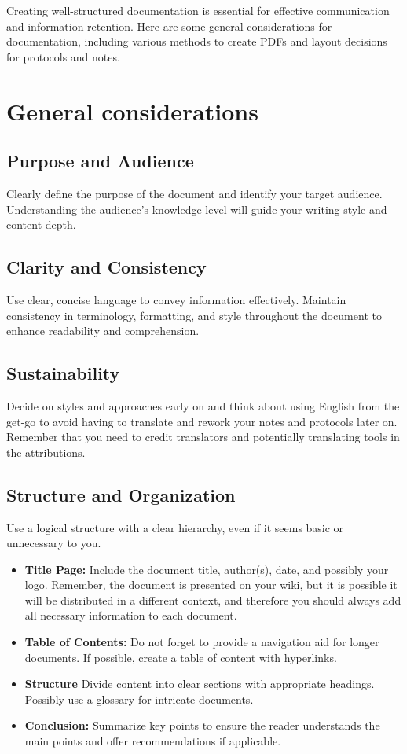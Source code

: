 
Creating well-structured documentation is essential for effective communication and information retention.
Here are some general considerations for documentation, including various methods to create PDFs and layout decisions for protocols and notes.
\section{General considerations} \label{sec:general-considerations}
\subsection*{Purpose and Audience}
Clearly define the purpose of the document and identify your target audience.
Understanding the audience's knowledge level will guide your writing style and content depth.

\subsection*{Clarity and Consistency}
Use clear, concise language to convey information effectively.
Maintain consistency in terminology, formatting, and style throughout the document to enhance readability and comprehension.

\subsection*{Sustainability}
Decide on styles and approaches early on and think about using English from the get-go to avoid having to translate and rework your notes and protocols later on.
Remember that you need to credit translators and potentially translating tools in the attributions. 

\subsection*{Structure and Organization}
Use a logical structure with a clear hierarchy, even if it seems basic or unnecessary to you.
\begin{itemize}
    \item \textbf{Title Page:} Include the document title, author(s), date, and possibly your logo.
    Remember, the document is presented on your wiki, but it is possible it will be distributed in a different context, and therefore you should always add all necessary information to each document.
    \item \textbf{Table of Contents:} Do not forget to provide a navigation aid for longer documents.
     If possible, create a table of content with hyperlinks.
    \item \textbf{Structure} Divide content into clear sections with appropriate headings.
    Possibly use a glossary for intricate documents.
    \item \textbf{Conclusion:} Summarize key points to ensure the reader understands the main points and offer recommendations if applicable.
\end{itemize}


